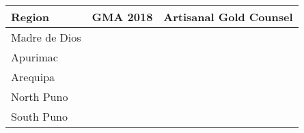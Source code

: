 \begin{table}[H]
\caption{}
    \label{tab:gamVagc}
\begin{tabular}{lcc}

\textbf{Region}        & \textbf{GMA 2018}    & \textbf{Artisanal Gold Counsel}                          \\
\hline
Madre de Dios & & \\

Apurimac      & &\\

Arequipa      & & \\

North Puno    & & \\

South Puno    & & \\
\hline
\end{tabular}
\centering
\end{table}

